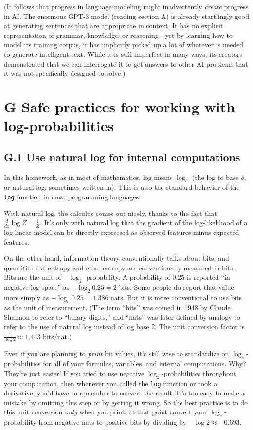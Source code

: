 (It follows that progress in language modeling might inadvertently \textit{create} progress in AI. The enormous GPT-3 model (reading section A) is already startlingly good at generating sentences that are appropriate in context. It has no explicit representation of grammar, knowledge, or reasoning—yet by learning how to model its training corpus, it has implicitly picked up a lot of whatever is needed to generate intelligent text. While it is still imperfect in many ways, its creators demonstrated that we can interrogate it to get answers to other AI problems that it was not specifically designed to solve.)  

\section*{G Safe practices for working with log-probabilities}

\subsection*{G.1 Use natural log for internal computations}
In this homework, as in most of mathematics, log means $\log_e$ (the log to base $e$, or natural log, sometimes written ln). This is also the standard behavior of the \texttt{log} function in most programming languages.  

With natural log, the calculus comes out nicely, thanks to the fact that $\frac{d}{dz}\log Z = \frac{1}{Z}$. It’s only with natural log that the gradient of the log-likelihood of a log-linear model can be directly expressed as observed features minus expected features.  

On the other hand, information theory conventionally talks about bits, and quantities like entropy and cross-entropy are conventionally measured in bits. Bits are the unit of $-\log_2$ probability. A probability of 0.25 is reported “in negative-log space” as $-\log_2 0.25 = 2$ bits. Some people do report that value more simply as $-\log_e 0.25 = 1.386$ nats. But it is more conventional to use bits as the unit of measurement. (The term “bits” was coined in 1948 by Claude Shannon to refer to “binary digits,” and “nats” was later defined by analogy to refer to the use of natural log instead of log base 2. The unit conversion factor is $\frac{1}{\log 2} \approx 1.443$ bits/nat.)  

Even if you are planning to \textit{print} bit values, it’s still wise to standardize on $\log_e$-probabilities for all of your formulas, variables, and internal computations. Why? They’re just easier! If you tried to use negative $\log_2$-probabilities throughout your computation, then whenever you called the \texttt{log} function or took a derivative, you’d have to remember to convert the result. It’s too easy to make a mistake by omitting this step or by getting it wrong. So the best practice is to do this unit conversion \textit{only} when you print: at that point convert your $\log_e$-probability from negative nats to positive bits by dividing by $-\log 2 \approx -0.693$.

